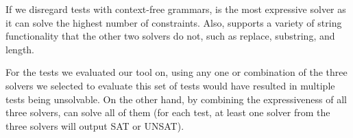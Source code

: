 If we disregard tests with context-free grammars,
\zstr is the most expressive solver as it can solve the highest number of constraints. Also, \zstr
supports a variety of string functionality that the other two solvers do not, such as replace, substring, and length.

For the \pickedtests tests we evaluated our tool on, using any one or combination of the three solvers we selected to evaluate this set of tests would have resulted
in multiple tests being unsolvable. On the other hand, by combining the
expressiveness of all three solvers, \imss can solve all of them (for each test,
at least one solver from the three solvers will output SAT or UNSAT).
